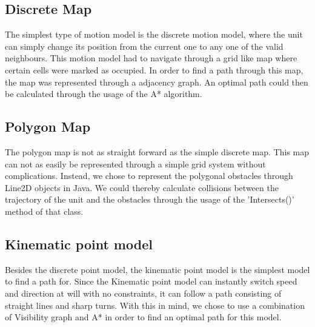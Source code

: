 \documentclass[a4paper,12pt]{article}
\begin{document}
\subsection{Discrete Map}
\label{sec:dm}
The simplest type of motion model is the discrete motion model, where the unit can simply change its position from the current one to any one of the valid neighbours.
This motion model had to navigate through a grid like map where certain cells were marked as occupied.
In order to find a path through this map, the map was represented through a adjacency graph. An optimal path could then be calculated through the usage of the A* algorithm.
\subsection{Polygon Map}
\label{sec:pm}
The polygon map is not as straight forward as the simple discrete map. This map can not as easily be represented through a simple grid system without complications. Instead, we chose to represent the polygonal obstacles through Line2D objects in  Java. We could thereby calculate collisions between the trajectory of the unit and the obstacles through the usage of the 'Intersects()' method of that class.
\subsection{Kinematic point model}
\label{sec:kpm}
Besides the discrete point model, the kinematic point model is the simplest model to find a path for. Since the Kinematic point model can instantly switch speed and direction at will with no constraints, it can follow a path consisting of straight lines and sharp turns.
With this in mind, we chose to use a combination of Visibility graph and A* in order to find an optimal path for this model.
\end{document}
